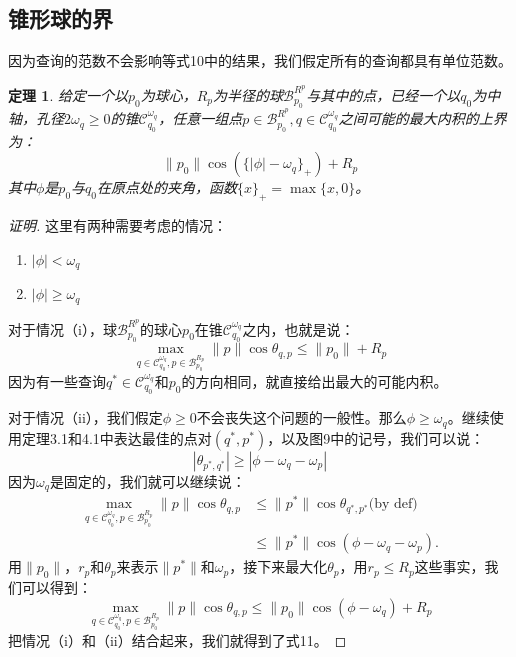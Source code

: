 \documentclass[twocolumn,a4paper]{article}
\begin{document}
\subsection{锥形球的界}
因为查询的范数不会影响等式10中的结果，我们假定所有的查询都具有单位范数。
\newtheorem{theorem3}{定理}[section]
\begin{theorem3}
给定一个以$p_0$为球心，$R_p$为半径的球$\mathcal{B}_{p_0}^{R^p}$与其中的点，已经一个以$q_0$为中轴，孔径$2\omega_q \ge 0$的锥$\mathcal{C}_{q_0}^{\omega_q}$，任意一组点$p\in\mathcal{B}_{p_0}^{R^p},q\in\mathcal{C}_{q_0}^{\omega_q}$之间可能的最大内积的上界为：
\begin{equation}
\|p_0\|\cos(\{|\phi|-\omega_q\}_+)+R_p
\end{equation}
其中$\phi$是$p_0$与$q_0$在原点处的夹角，函数$\{x\}_+ = \max\{x,0\}$。
\end{theorem3}
\begin{proof}[证明]
这里有两种需要考虑的情况：
\begin{enumerate}[label={\roman*}]
\item $|\phi| < \omega_q$
\item $|\phi| \ge \omega_q$
\end{enumerate}
对于情况（i），球$\mathcal{B}_{p_0}^{R^p}$的球心$p_0$在锥$\mathcal{C}_{q_0}^{\omega_q}$之内，也就是说：
\begin{equation}
\max_{q\in\mathcal{C}_{q_0}^{\omega_q},p\in\mathcal{B}_{p_0}^{R_p}}\|p\|\cos\theta_{q,p} \le \|p_0\| + R_p
\end{equation}
因为有一些查询$q^*\in\mathcal{C}_{q_0}^{\omega_q}$和$p_0$的方向相同，就直接给出最大的可能内积。

对于情况（ii），我们假定$\phi\ge0$不会丧失这个问题的一般性。那么$\phi\ge\omega_q$。继续使用定理3.1和4.1中表达最佳的点对$(q^*,p^*)$，以及图9中的记号，我们可以说：
\begin{equation}
|\theta_{p^*,q^*}| \ge | \phi - \omega_q - \omega_p |
\end{equation}
因为$\omega_q$是固定的，我们就可以继续说：
\begin{equation}
\begin{aligned}
\max_{q\in\mathcal{C}_{q_0}^{\omega_q},p\in\mathcal{B}_{p_0}^{R_p}} \|p\|\cos\theta_{q,p} & \le \|p^*\|\cos\theta_{q^*,p^*}\text{(by def)} \\
& \le \|p^*\|\cos(\phi - \omega_q - \omega_p).
\end{aligned}
\end{equation}
用$\|p_0\|$，$r_p$和$\theta_p$来表示$\|p^*\|$和$\omega_p$，接下来最大化$\theta_p$，用$r_p \le R_p$这些事实，我们可以得到：
\begin{equation}
\max_{q\in\mathcal{C}_{q_0}^{\omega_q},p\in\mathcal{B}_{p_0}^{R_p}} \|p\|\cos\theta_{q,p} \le \|p_0\|\cos(\phi - \omega_q) + R_p
\end{equation}
把情况（i）和（ii）结合起来，我们就得到了式11。
\end{proof}
\end{document}
